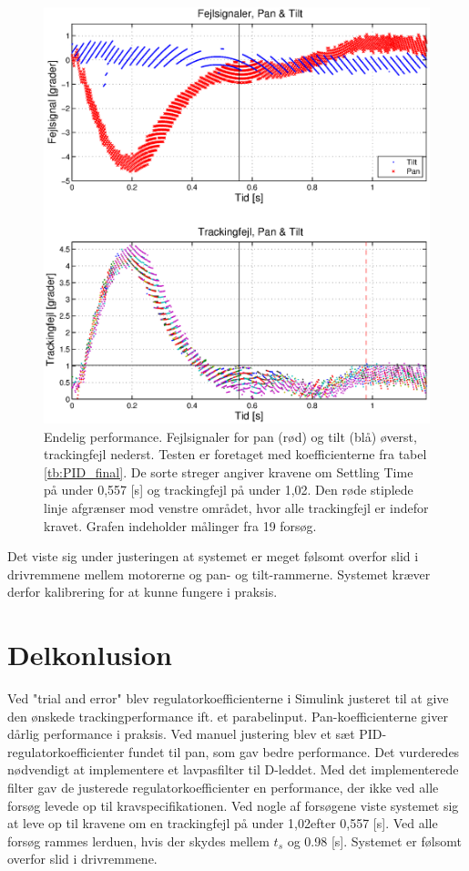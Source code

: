 \begin{figure}[h!]
\centering
\includegraphics[width=1\textwidth]{./graphics/pidPhys2.eps}
\caption[Endelig performance]{Endelig performance. Fejlsignaler for pan (rød) og tilt (blå) øverst, trackingfejl nederst.
Testen er foretaget med koefficienterne fra tabel \ref{tb:PID_final}.
De sorte streger angiver kravene om Settling Time på under 0,557 [s] og trackingfejl på under 1,02\degree{}. 
Den røde stiplede linje afgrænser mod venstre området, hvor alle trackingfejl er 
indefor kravet.
Grafen indeholder målinger fra 19 forsøg.} 
\label{fig:PID_final}
\end{figure}

Det viste sig under justeringen at systemet er meget følsomt overfor slid i drivremmene mellem motorerne og pan- og tilt-rammerne.
Systemet kræver derfor kalibrering for at kunne fungere i praksis.

\section{Delkonlusion}
Ved "trial and error" blev regulatorkoefficienterne i Simulink justeret til at give den ønskede 
trackingperformance ift. et parabelinput. Pan-koefficienterne giver dårlig performance i praksis.
Ved manuel justering blev et sæt PID-regulatorkoefficienter fundet til pan, som gav bedre performance.
Det vurderedes nødvendigt at implementere et lavpasfilter til D-leddet.
Med det implementerede filter gav de justerede regulatorkoefficienter en performance,
der ikke ved alle forsøg levede op til kravspecifikationen. Ved nogle af forsøgene viste
systemet sig at leve op til kravene om en trackingfejl på under 1,02\degree efter 0,557 [s].
Ved alle forsøg rammes lerduen, hvis der skydes mellem $t_s$ og 0.98 [s].
Systemet er følsomt overfor slid i drivremmene.